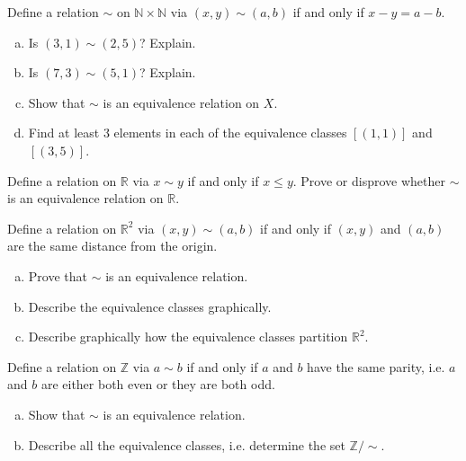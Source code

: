 \documentclass[11pt,letterpaper]{article}
\begin{document}
\homework{}

 Define a relation $\sim$ on $\mathbb{N} \times \mathbb{N}$ via $(x, y) \sim (a, b)$ if and only if $x - y= a - b$.  
        \begin{enumerate}[(a)]
        \item Is $(3, 1) \sim (2, 5)$? Explain.
        \item Is $(7, 3) \sim (5, 1)$? Explain. 
        \item Show that $\sim$ is an equivalence relation on $X$.
        \item Find at least 3 elements in each of the equivalence classes $[(1, 1)]$ and $[(3, 5)]$. 
        \end{enumerate} \pspace





\newpage





  Define a relation on $\mathbb{R}$ via $x \sim y$ if and only if $x \leq y$. Prove or disprove whether $\sim$ is an equivalence relation on $\mathbb{R}$. \pspace





\newpage





 Define a relation on $\mathbb{R}^2$ via $(x, y) \sim (a, b)$ if and only if $(x, y)$ and $(a, b)$ are the same distance from the origin. 
	\begin{enumerate}[(a)]
	\item Prove that $\sim$ is an equivalence relation.
	\item Describe the equivalence classes graphically. 
	\item Describe graphically how the equivalence classes partition $\mathbb{R}^2$. 
	\end{enumerate}





\newpage





 Define a relation on $\mathbb{Z}$ via $a \sim b$ if and only if $a$ and $b$ have the same parity, i.e. $a$ and $b$ are either both even or they are both odd. 
        \begin{enumerate}[(a)]
        \item Show that $\sim$ is an equivalence relation. 
        \item Describe all the equivalence classes, i.e. determine the set $\mathbb{Z}/\sim$. 
        \end{enumerate} \pspace
\end{document}
